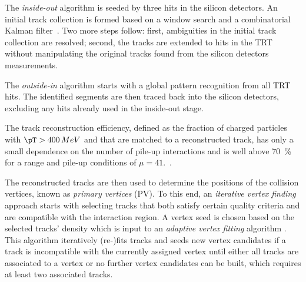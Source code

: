 The \emph{inside-out} algorithm is seeded by three hits in the silicon detectors. An initial track collection is formed based on a window search and a combinatorial Kalman filter~\cite{fruhwirth_application_1987}. Two more steps follow: first, ambiguities in the initial track collection are resolved; second, the tracks are extended to hits in the TRT without manipulating the original tracks found from the silicon detectors measurements.

The \emph{outside-in} algorithm starts with a global pattern recognition from all TRT hits. The identified segments are then traced back into the silicon detectors, excluding any hits already used in the inside-out stage.

The track reconstruction efficiency, defined as the fraction of charged particles with $\pT > 400\,MeV$ and  that are matched to a reconstructed track, has only a small dependence on the number of pile-up interactions and is well above \SI{70}{\percent} for a range  and pile-up conditions of $\mu = 41$.~\cite{ATLAS-CONF-2012-042}. 

The reconstructed tracks are then used to determine the positions of the collision vertices, known as \emph{primary vertices} (PV). To this end, an \emph{iterative vertex finding} approach \cite{PERF-2015-01} starts with selecting tracks that both satisfy certain quality criteria and are compatible with the interaction region. A vertex seed is chosen based on the selected tracks' density which is input to an \emph{adaptive vertex fitting} algorithm . 
This algorithm iteratively (re-)fits tracks and seeds new vertex candidates if a track is incompatible with the currently assigned vertex until either all tracks are associated to a vertex or no further vertex candidates can be built, which requires at least two associated tracks.

